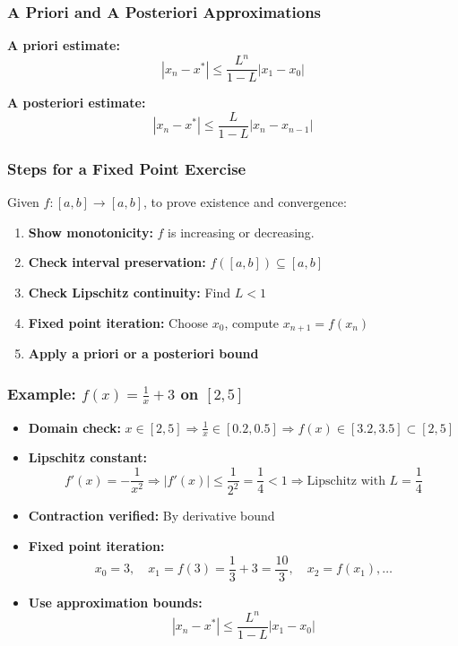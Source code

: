 \subsubsection*{A Priori and A Posteriori Approximations}

\textbf{A priori estimate:}
\[
|x_n - x^*| \le \frac{L^n}{1 - L} |x_1 - x_0|
\]

\textbf{A posteriori estimate:}
\[
|x_n - x^*| \le \frac{L}{1 - L} |x_n - x_{n-1}|
\]

\subsubsection*{Steps for a Fixed Point Exercise}

Given \(f: [a, b] \to [a, b]\), to prove existence and convergence:

\begin{enumerate}
    \item \textbf{Show monotonicity:} \(f\) is increasing or decreasing.
    \item \textbf{Check interval preservation:} \(f([a, b]) \subseteq [a, b]\)
    \item \textbf{Check Lipschitz continuity:} Find \(L < 1\)
    \item \textbf{Fixed point iteration:} Choose \(x_0\), compute \(x_{n+1} = f(x_n)\)
    \item \textbf{Apply a priori or a posteriori bound}
\end{enumerate}

\subsubsection*{Example: \(f(x) = \frac{1}{x} + 3\) on \([2, 5]\)}

\begin{itemize}[label=\(-\)]
\item \textbf{Domain check:} \(x \in [2, 5] \Rightarrow \frac{1}{x} \in [0.2, 0.5] \Rightarrow f(x) \in [3.2, 3.5] \subset [2, 5]\)
\item \textbf{Lipschitz constant:}
\[
f'(x) = -\frac{1}{x^2} \Rightarrow |f'(x)| \le \frac{1}{2^2} = \frac{1}{4} < 1
\Rightarrow \text{Lipschitz with } L = \frac{1}{4}
\]
\item \textbf{Contraction verified:} By derivative bound
\item \textbf{Fixed point iteration:}
\[
x_0 = 3, \quad x_1 = f(3) = \frac{1}{3} + 3 = \frac{10}{3}, \quad x_2 = f(x_1), \dots
\]
\item \textbf{Use approximation bounds:}
\[
|x_n - x^*| \le \frac{L^n}{1 - L} |x_1 - x_0|
\]
\end{itemize}
\newpage